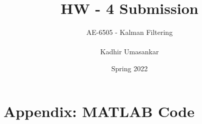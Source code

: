\documentclass[12pt]{report}
\author{AE-6505 - Kalman Filtering \\\\ Kadhir Umasankar}
\title{HW - 4 Submission}
\date{Spring 2022}
\newlength{\originalVOffset}
\newlength{\originalHOffset}
\theoremstyle{definition}
\begin{document}
\maketitle

\setlength{\voffset}{-0.1cm}
\setlength{\hoffset}{-0.1cm}

\setlength{\voffset}{\originalVOffset}
\setlength{\hoffset}{\originalHOffset}

\section{Appendix: MATLAB Code}
\inputminted[linenos=true, breaklines=true, breakanywhere=true, fontsize=\scriptsize]{MATLAB}{../hw4.m}
\end{document}
